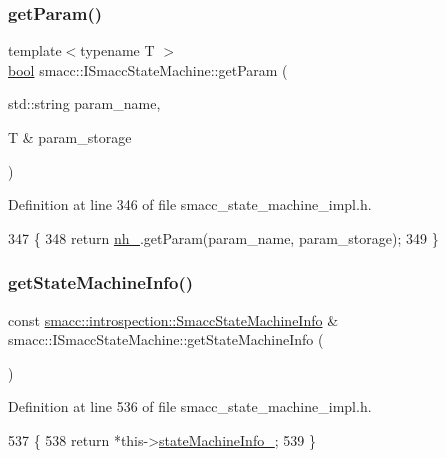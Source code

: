 \subsubsection{\texorpdfstring{get\+Param()}{getParam()}}
{\footnotesize\ttfamily template$<$typename T $>$ \\
\hyperlink{classbool}{bool} smacc\+::\+I\+Smacc\+State\+Machine\+::get\+Param (\begin{DoxyParamCaption}\item[{std\+::string}]{param\+\_\+name,  }\item[{T \&}]{param\+\_\+storage }\end{DoxyParamCaption})\hspace{0.3cm}{\ttfamily [protected]}}



Definition at line 346 of file smacc\+\_\+state\+\_\+machine\+\_\+impl.\+h.


\begin{DoxyCode}
347   \{
348     \textcolor{keywordflow}{return} \hyperlink{classsmacc_1_1ISmaccStateMachine_ad8877bcca9dbb345fe72cca839c93dd3}{nh\_}.getParam(param\_name, param\_storage);
349   \}
\end{DoxyCode}
\mbox{\label{classsmacc_1_1ISmaccStateMachine_a3b1facb0477325fe43b447fc21d9eb7d}} 
\subsubsection{\texorpdfstring{get\+State\+Machine\+Info()}{getStateMachineInfo()}}
{\footnotesize\ttfamily const \hyperlink{classsmacc_1_1introspection_1_1SmaccStateMachineInfo}{smacc\+::introspection\+::\+Smacc\+State\+Machine\+Info} \& smacc\+::\+I\+Smacc\+State\+Machine\+::get\+State\+Machine\+Info (\begin{DoxyParamCaption}{ }\end{DoxyParamCaption})\hspace{0.3cm}{\ttfamily [inline]}}



Definition at line 536 of file smacc\+\_\+state\+\_\+machine\+\_\+impl.\+h.


\begin{DoxyCode}
537   \{
538     \textcolor{keywordflow}{return} *this->\hyperlink{classsmacc_1_1ISmaccStateMachine_a0914aa27c3f51374c338d89a32b135d1}{stateMachineInfo\_};
539   \}
\end{DoxyCode}
\mbox{\label{classsmacc_1_1ISmaccStateMachine_a2d0b1742f17dd77d5df217153e8b5259}} 
